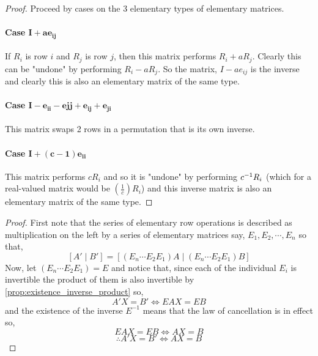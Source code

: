 \documentclass[MathsNotesBase.tex]{subfiles}
\begin{document}
{		\bigskip	
		\begin{proof} Proceed by cases on the 3 elementary types of elementary matrices.
		~\paragraph{Case $\bm{ I + ae_{ij} }$}  If $R_i$ is row $i$ and $R_j$ is row $j$, then this matrix performs $R_i + aR_j$. Clearly this can be "undone" by performing $R_i - aR_j$. So the matrix, $I - ae_{ij}$ is the inverse and clearly this is also an elementary matrix of the same type.
		\paragraph{Case $\bm{ I - e_{ii} - e{jj} + e_{ij} + e_{ji} }$} This matrix swaps 2 rows in a permutation that is its own inverse.
		\paragraph{Case $\bm{ I + (c - 1)e_{ii} }$} This matrix performs $cR_i$ and so it is "undone" by performing ${c}^{-1}R_i$ (which for a real-valued matrix would be $\left(\frac{1}{c}\right)R_i$) and this inverse matrix is also an elementary matrix of the same type. 
		\end{proof}
		
		\bigskip
		\begin{proof}
		First note that the series of elementary row operations is described as multiplication on the left by a series of elementary matrices say, $E_1, E_2, \cdots , E_n$ so that,
		\[ [A' \;\vert\; B'] = [(E_n\cdots E_2E_1)A \;\vert\; (E_n\cdots E_2E_1)B] \]
		Now, let $(E_n\cdots E_2E_1) = E$ and notice that, since each of the individual $E_i$ is invertible the product of them is also invertible by \autoref{prop:existence_inverse_product} so,
		\[ A'X = B' \iff EAX = EB \]
		and the existence of the inverse $E^{-1}$ means that the law of cancellation is in effect so,
		\[ EAX = EB \iff AX = B \]
		\[ \therefore A'X = B' \iff AX = B \]
		\end{proof}
		
}
\end{document}
